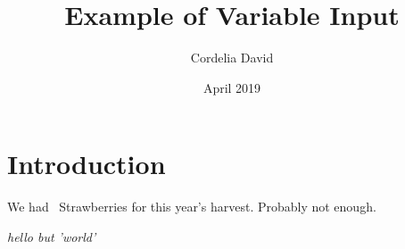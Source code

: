 \documentclass{article} \usepackage[utf8]{inputenc}
\title{Example of Variable Input}
\author{Cordelia David} \date{April 2019}
\begin{document}
\newcommand{\firstchar}[1]{%
    \StrLeft{#1}{1}[\firstletter]%
    \firstletter
}

\def\charboi[#1]#2{\textit{#1 but #2}}


\maketitle

\section{Introduction}

We had \Strawberries\ Strawberries for this year's harvest. Probably not enough.

\charboi[hello]{'world'}
\end{document}
